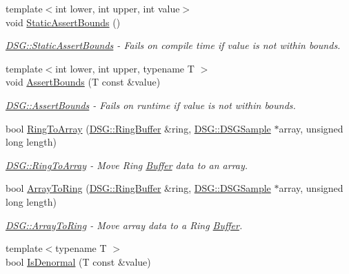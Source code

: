 \begin{DoxyCompactItemize}
{\footnotesize template$<$int lower, int upper, int value$>$ }\\void \hyperlink{namespace_d_s_g_a3fa12557d889e704f2e33d88929ec67a}{Static\+Assert\+Bounds} ()
\begin{DoxyCompactList}\small\item\em \hyperlink{namespace_d_s_g_a3fa12557d889e704f2e33d88929ec67a}{D\+S\+G\+::\+Static\+Assert\+Bounds} -\/ Fails on compile time if value is not within bounds. \end{DoxyCompactList}\item 
{\footnotesize template$<$int lower, int upper, typename T $>$ }\\void \hyperlink{namespace_d_s_g_a386b0133be9f4c7cb1ba014170ce294d}{Assert\+Bounds} (T const \&value)
\begin{DoxyCompactList}\small\item\em \hyperlink{namespace_d_s_g_a386b0133be9f4c7cb1ba014170ce294d}{D\+S\+G\+::\+Assert\+Bounds} -\/ Fails on runtime if value is not within bounds. \end{DoxyCompactList}\item 
bool \hyperlink{namespace_d_s_g_a4049a445d7cb9ee4f9140bdfdbd5e11c}{Ring\+To\+Array} (\hyperlink{class_d_s_g_1_1_ring_buffer}{D\+S\+G\+::\+Ring\+Buffer} \&ring, \hyperlink{namespace_d_s_g_ac39a94cd27ebcd9c1e7502d0c624894a}{D\+S\+G\+::\+D\+S\+G\+Sample} $\ast$array, unsigned long length)
\begin{DoxyCompactList}\small\item\em \hyperlink{namespace_d_s_g_a4049a445d7cb9ee4f9140bdfdbd5e11c}{D\+S\+G\+::\+Ring\+To\+Array} -\/ Move Ring \hyperlink{class_d_s_g_1_1_buffer}{Buffer} data to an array. \end{DoxyCompactList}\item 
bool \hyperlink{namespace_d_s_g_a608643638b3a678c17b14c406d7edc85}{Array\+To\+Ring} (\hyperlink{class_d_s_g_1_1_ring_buffer}{D\+S\+G\+::\+Ring\+Buffer} \&ring, \hyperlink{namespace_d_s_g_ac39a94cd27ebcd9c1e7502d0c624894a}{D\+S\+G\+::\+D\+S\+G\+Sample} $\ast$array, unsigned long length)
\begin{DoxyCompactList}\small\item\em \hyperlink{namespace_d_s_g_a608643638b3a678c17b14c406d7edc85}{D\+S\+G\+::\+Array\+To\+Ring} -\/ Move array data to a Ring \hyperlink{class_d_s_g_1_1_buffer}{Buffer}. \end{DoxyCompactList}\item 
{\footnotesize template$<$typename T $>$ }\\bool \hyperlink{namespace_d_s_g_a9eee3c39a1f45d42f0b4fa7201d3ba3d}{Is\+Denormal} (T const \&value)

\end{DoxyCompactItemize}
